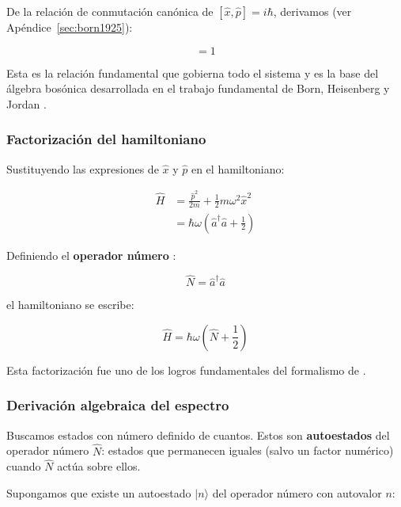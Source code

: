 \documentclass[11pt,a4paper,spanish]{book}
\begin{document}
De la relación de conmutación canónica de  \cite{born1925} $[\hat{x}, \hat{p}] = i\hbar$, derivamos (ver Apéndice~\ref{sec:born1925}):

\begin{equation}
	[\hat{a}, \hat{a}^\dagger] = 1
	\label{eq:conmutador}
\end{equation}

Esta es la relación fundamental que gobierna todo el sistema y es la base del álgebra bosónica desarrollada en el trabajo fundamental de Born, Heisenberg y Jordan \citep{bornheisenberg1926}.

\subsubsection{Factorización del hamiltoniano}

Sustituyendo las expresiones de $\hat{x}$ y $\hat{p}$ en el hamiltoniano:

\begin{align}
	\hat{H} &= \frac{\hat{p}^2}{2m} + \frac{1}{2}m\omega^2\hat{x}^2 \\
	&= \hbar\omega\left(\hat{a}^\dagger\hat{a} + \frac{1}{2}\right)
\end{align}

Definiendo el \textbf{operador número} \cite{dirac1930}:

\begin{equation}
	\hat{N} = \hat{a}^\dagger\hat{a}
\end{equation}

el hamiltoniano se escribe:

\begin{equation}
	\boxed{\hat{H} = \hbar\omega\left(\hat{N} + \frac{1}{2}\right)}
	\label{eq:hamiltoniano_factorizado}
\end{equation}

Esta factorización fue uno de los logros fundamentales del formalismo de \cite{dirac1930}.

\subsubsection{Derivación algebraica del espectro}
Buscamos estados con número definido de cuantos. Estos son \textbf{autoestados} del operador número $\hat{N}$: estados que permanecen iguales (salvo un factor numérico) cuando $\hat{N}$ actúa sobre ellos.

Supongamos que existe un autoestado $|n\rangle$ del operador número con autovalor $n$:
\end{document}
